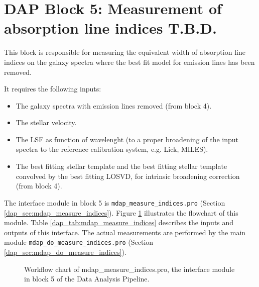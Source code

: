 \documentclass[11pt]{book}
\begin{document}


\section{DAP Block 5: Measurement of absorption line indices T.B.D.}
\label{dap_sec:block5}

This block is responsible for measuring the equivalent width of
absorption line indices on the galaxy spectra where the best fit model
for emission lines has been removed.

It requires the following inputs:
\begin{itemize}
 
\item The galaxy spectra with emission lines removed (from block 4).

\item The stellar velocity.

  \item The LSF as function of wavelenght (to a proper
broadening of the input spectra to the reference calibration system,
e.g. Lick, MILES).

\item The best fitting stellar template and the best fitting stellar
  template convolved by the best fitting LOSVD, for intrinsic
  broadening correction (from block 4).

\end{itemize}

The interface module in block 5 is {\tt mdap\_measure\_indices.pro}
(Section \ref{dap_sec:mdap_measure_indices}). Figure
\ref{dap_fig:block5} illustrates the flowchart of this module.  Table
\ref{dap_tab:mdap_measure_indices} describes the inputs and outputs of
this interface. The actual measurements are performed by the main
module {\tt mdap\_do\_measure\_indices.pro} (Section
\ref{dap_sec:mdap_do_measure_indices}).


\begin{figure}
\begin{center}
\caption{Workflow chart of mdap\_measure\_indices.pro, the interface
  module in block 5 of the Data Analysis Pipeline.}
 \label{dap_fig:block5}
\end{center}
\end{figure}
\end{document}
